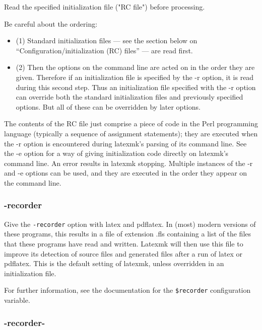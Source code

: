 Read the specified initialization file ("RC file")  before  processing.

Be careful about the ordering: 

\begin{itemize}
	

\item (1) Standard initialization files --- see the section below on
				``Configuration/initialization  (RC) files''  ---  are read first.  

\item (2) Then the options on the command line are acted on in the order they
				are given.  Therefore if  an initialization  file  is  specified by the
				-r option, it is read during this second step.  Thus an initialization
				file specified with the -r option can override both the standard
				initialization files and previously specified options.  But all of
				these can be overridden by later options.
\end{itemize}

The contents of the RC file just comprise a piece of code in the Perl
programming language (typically a  sequence  of  assignment statements); they
are executed when the -r option is encountered during latexmk's parsing of its
command line.  See the -e option for  a  way  of giving initialization code
directly on latexmk's command line.  An error results in latexmk  stopping.
Multiple instances of the -r and -e options can be used, and they are executed
in the order they appear on the command line.


\subsubsection{-recorder}

Give the \verb|-recorder| option with latex and  pdflatex.   In  (most) modern
versions of these programs, this results in a file of extension .fls
containing a list of the files that these  programs have  read  and written.
Latexmk will then use this file to improve its detection of source files and
generated files after  a run  of  latex  or pdflatex.  This is the default
setting of latexmk, unless overridden in an initialization file.

For further information, see the documentation for the \verb|$recorder| configuration
variable.


\subsubsection{-recorder-}


